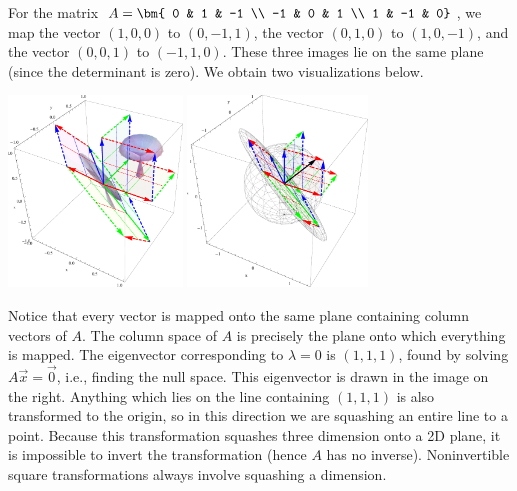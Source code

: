 \begin{example}
For the matrix 
$A=\bm{ 0 & 1 & -1 \\ -1 & 0 & 1 \\ 1 & -1 & 0}$, we map 
the vector $(1,0,0)$ to $(0,-1,1)$, 
the vector $(0,1,0)$ to $(1,0,-1)$, and 
the vector $(0,0,1)$ to $(-1,1,0)$. These three images lie on the same plane (since the determinant is zero).  We obtain two visualizations below. 
\begin{center}
\includegraphics[height=2in]{Linear-Transformations/support/LTsingular3da}
\includegraphics[height=2in]{Linear-Transformations/support/LTsingular3db}
\end{center}
Notice that every vector  is mapped onto the same plane containing column vectors of $A$. 
The column space of $A$ is precisely the plane onto which everything is mapped. 
The eigenvector corresponding to $\lambda =0$ is $(1,1,1)$, found by solving $A\vec x=\vec 0$, i.e., finding the null space.
This eigenvector is drawn in the image on the right.  
Anything which lies on the line containing $(1,1,1)$ is also transformed to the origin, so in this direction we are squashing an entire line to a point. 
Because this transformation squashes three dimension onto a 2D plane, it is impossible to invert the transformation (hence $A$ has no inverse). 
Noninvertible square transformations always involve squashing a dimension.

  
\end{example}

